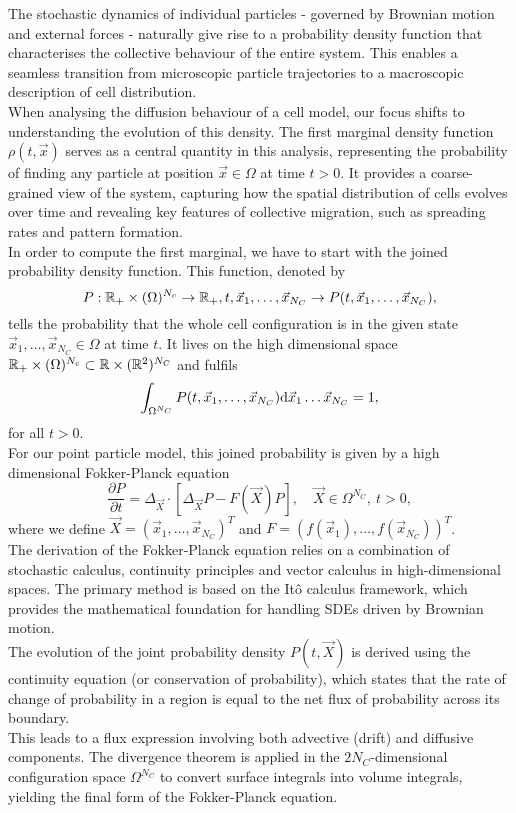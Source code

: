 The stochastic dynamics of individual particles - governed by Brownian motion and external forces - naturally give rise to a probability density function that characterises the collective behaviour of the entire system. 
This enables a seamless transition from microscopic particle trajectories to a macroscopic description of cell distribution. \\
When analysing the diffusion behaviour of a cell model, our focus shifts to understanding the evolution of this density. 
The first marginal density function $\rho(t, \vec{x})$ serves as a central quantity in this analysis, representing the probability of finding any particle at position $\vec{x} \in \Omega$ at time $t > 0$. 
It provides a coarse-grained view of the system, capturing how the spatial distribution of cells evolves over time and revealing key features of collective migration, such as spreading rates and pattern formation. \\ 

In order to compute the first marginal, we have to start with the joined probability density function. 
This function, denoted by 
\[
P: \mathbb{R}_{+} \times (\Omega)^{N_c} \rightarrow \mathbb{R}_+, \\	
t, \vec{x}_1, \ldots, \vec{x}_{N_C} \rightarrow P(t, \vec{x}_1, \ldots, \vec{x}_{N_C}), 
\]
tells the probability that the whole cell configuration is in the given state $\vec{x}_1, \ldots, \vec{x}_{N_C} \in \Omega$ at time $t$. 
It lives on the high dimensional space $\mathbb{R}_{+} \times (\Omega)^{N_c} \subset \mathbb{R} \times (\mathbb{R}^2)^{N_C}$ and fulfils
\[
\int_{\Omega^{N_C}} P(t, \vec{x}_1, \ldots, \vec{x}_{N_C}) \mathrm{d} \vec{x}_1 \ldots \vec{x}_{N_C} = 1, 
\]
for all $t>0$. \\ 

For our point particle model, this joined probability is given by a high dimensional Fokker-Planck equation 
\[
\dfrac{\partial P}{\partial t} = \Delta_{\vec{X}} \cdot [\Delta_{\vec{X}} P - F(\vec{X}) P ], \quad \vec{X} \in \Omega^{N_C}, \: t>0, 
\] 
where we define $\vec{X} = (\vec{x}_1, \ldots, \vec{x}_{N_C})^T$ and $F = (f(\vec{x}_1), \ldots, f(\vec{x}_{N_C}))^T$. \\
The derivation of the Fokker-Planck equation relies on a combination of stochastic calculus, continuity principles and vector calculus in high-dimensional spaces. 
The primary method is based on the Itô calculus framework, which provides the mathematical foundation for handling SDEs driven by Brownian motion. \\
The evolution of the joint probability density $ P(t, \vec{X}) $ is derived using the continuity equation (or conservation of probability), which states that the rate of change of probability in a region is equal to the net flux of probability across its boundary. \\
This leads to a flux expression involving both advective (drift) and diffusive components. 
The divergence theorem is applied in the $2 N_C$-dimensional configuration space $ \Omega^{N_C} $ to convert surface integrals into volume integrals, yielding the final form of the Fokker-Planck equation. \\

